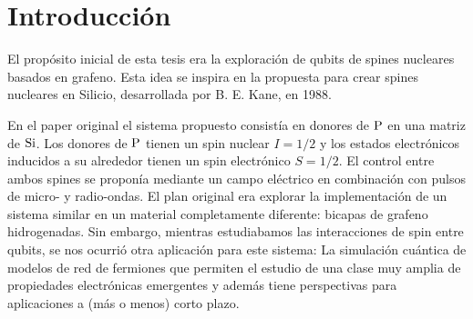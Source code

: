 \chapter{Introducción}
\label{ch:introduction_es}


El propósito inicial de esta tesis era la exploración de qubits de spines nucleares basados en grafeno. Esta idea se inspira en la propuesta para crear spines nucleares en Silicio, desarrollada por B. E. Kane\cite{Kane1988}, en 1988.

En el paper original el sistema propuesto consistía en donores de $\ce{P}$ en una matriz de $\ce{Si}$. Los donores de $\ce{P}$ tienen un spin nuclear $I=1/2$ y los estados electrónicos inducidos a su alrededor tienen un spin electrónico $S=1/2$.
El control entre ambos spines se proponía mediante un campo eléctrico en combinación con pulsos de micro- y radio-ondas.
El plan original era explorar la implementación de un sistema similar en un material completamente diferente: bicapas de grafeno hidrogenadas.
Sin embargo, mientras estudiabamos las interacciones de spin entre qubits, se nos ocurrió otra aplicación para este sistema: La simulación cuántica de modelos de red de fermiones que permiten el estudio de una clase muy amplia de propiedades electrónicas emergentes y además tiene perspectivas para aplicaciones a (más o menos) corto plazo.
\medskip


